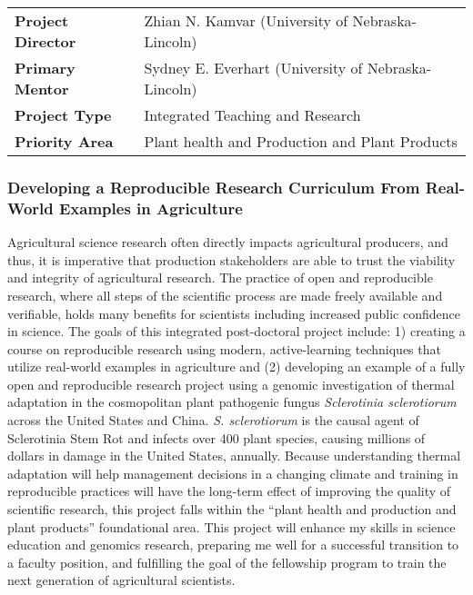 \documentclass[12pt,letterpaper]{article}
\title{\ruleline{Project Summary}}
\begin{document}
\maketitle

\vspace{2em}

\begin{centering}
\begin{tabular}{ll}
\textbf{Project Director} & Zhian N. Kamvar (University of Nebraska-Lincoln)\\
\textbf{Primary Mentor  } & Sydney E. Everhart (University of Nebraska-Lincoln)\\
\textbf{Project Type    } & Integrated Teaching and Research\\
\textbf{Priority Area   } & Plant health and Production and Plant Products
\end{tabular}
\end{centering}

\vspace{2em}

\subsubsection*{Developing a Reproducible Research Curriculum From Real-World Examples in Agriculture}

Agricultural science research often directly impacts agricultural producers, and thus, it is imperative that production stakeholders are able to trust the viability and integrity of agricultural research. 
The practice of open and reproducible research, where all steps of the scientific process are made freely available and verifiable, holds many benefits for scientists including increased public confidence in science. 
The goals of this integrated post-doctoral project include: 1) creating a course on reproducible research using modern, active-learning techniques that utilize real-world examples in agriculture and (2) developing an example of a fully open and reproducible research project using a genomic investigation of thermal adaptation in the cosmopolitan plant pathogenic fungus \textit{Sclerotinia sclerotiorum} across the United States and China. 
\textit{S. sclerotiorum} is the causal agent of Sclerotinia Stem Rot and infects over 400 plant species, causing millions of dollars in damage in the United States, annually. 
Because understanding thermal adaptation will help management decisions in a changing climate and training in reproducible practices will have the long-term effect of improving the quality of scientific research, this project falls within the ``plant health and production and plant products'' foundational area. 
This project will enhance my skills in science education and genomics research, preparing me well for a successful transition to a faculty position, and fulfilling the goal of the fellowship program to train the next generation of agricultural scientists.
\end{document}
